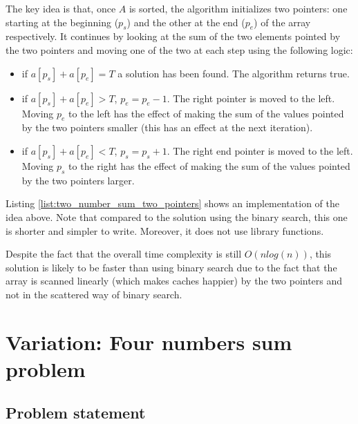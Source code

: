 The key idea is that, once $A$ is sorted, the algorithm initializes
two pointers: one starting at the beginning ($p_s$) and the other at the end ($p_e$) of the array respectively.
It continues by looking at the sum of the two elements pointed by the two pointers and moving one of
the two at each step using the following logic: 
\begin{itemize}
	\item if $a[p_s]+a[p_e] = T$ a solution has been found. The algorithm returns true.
	\item if $a[p_s]+a[p_e] > T$, $p_e=p_e-1$. The right pointer is moved to the left. 
	Moving	$p_e$ to the left has the effect of making the sum of the values pointed by the two pointers smaller (this has an effect at the next iteration). 
	\item if $a[p_s]+a[p_e] < T$, $p_s=p_s+1$. The right end pointer is moved to the left. Moving $p_s$ to the right has the effect of making the sum of the values pointed by the two pointers larger. 
\end{itemize}



Listing \ref{list:two_number_sum_two_pointers} shows an implementation of the idea above. Note that compared to the solution using the binary search, this one is shorter and simpler to write. Moreover, it does not use library functions. 



Despite the fact that the overall time complexity is still $O(n log(n))$, this solution is likely to be faster than
using binary search due to the fact that the array is scanned linearly (which makes caches happier) by the two pointers and not in the scattered way of binary search.

\section*{Variation: Four numbers sum problem}
\label{sec:four_number}

\subsection{Problem statement}

